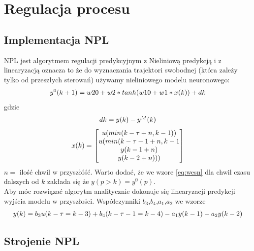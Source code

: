 \chapter{Regulacja procesu}
	\label{ch:reg}
	
	\section{Implementacja NPL}
		\label{sec:NPL}
		NPL jest algorytmem regulacji predykcyjnym z Nieliniową predykcją i z linearyzacją oznacza to że do wyznaczania trajektori swobodnej (która zależy tylko od przeszłych sterowań) używamy nieliniowego modelu neuronowego:
		\begin{equation}
		\begin{tabular}{l}
		$y^0(k+1)=w20+w2*tanh(w10+w1*x(k))+dk$
		\end{tabular}
		\label{eq:NPL_y0}
		\end{equation}
		gdzie
		\begin{equation}
		\begin{tabular}{l}
		$dk = y(k)-y^M(k)$
		\end{tabular}
		\label{eq:dk}
		\end{equation}
		\begin{equation}
		\begin{tabular}{l}
		$x(k)=$ $\begin{bmatrix}u(min(k-\tau+n,k-1))\\u(min(k-\tau-1+n,k-1\\y(k-1+n)\\y(k-2+n)))\end{bmatrix}$
		\end{tabular}
		\label{eq:wesn}
		\end{equation}
		$n=$ ilość chwil w przyszłóść.
		Warto dodać, że we wzore \ref{eq:wesn} dla chwil czasu dalszych od $k$ zakłada się że $y(p>k)=y^0(p)$.\\
		Aby móc rozwiązać algorytm analitycznie dokonuje się linearyzacji predykcji wyjścia modelu w przyszłości. Współczynniki $b_3$,$b_4$,$a_1$,$a_2$ we wzorze
		\begin{equation}
		\begin{tabular}{l}
		$y(k)=b_3u(k-\tau=k-3)+b_4(k-\tau-1=k-4)-a_1y(k-1)-a_2y(k-2)$
		\end{tabular}
		\label{eq:NPL_wyjscielinear}
		\end{equation}
		
		
	\section{Strojenie NPL}
		\label{sec:stroj_NPL}
		
